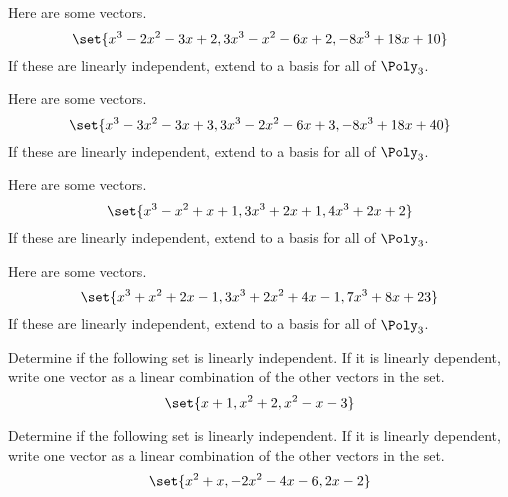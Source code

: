 \begin{ex} Here are some vectors.
\begin{equation*}
\set{x^{3}-2x^{2}-3x+2,3x^{3}-x^{2}-6x+2,-8x^{3}+18x+10}
\end{equation*}
If these are linearly independent, extend to a basis for all of $\Poly_{3}$.
\end{ex}

\begin{ex} Here are some vectors.
\begin{equation*}
\set{x^{3}-3x^{2}-3x+3,3x^{3}-2x^{2}-6x+3,-8x^{3}+18x+40}
\end{equation*}
If these are linearly independent, extend to a basis for all of $\Poly_{3}$.
\end{ex}

\begin{ex} Here are some vectors.
\begin{equation*}
\set{x^{3}-x^{2}+x+1,3x^{3}+2x+1,4x^{3}+2x+2}
\end{equation*}
If these are linearly independent, extend to a basis for all of $\Poly_{3}$.
\end{ex}

\begin{ex} Here are some vectors.
\begin{equation*}
\set{x^{3}+x^{2}+2x-1,3x^{3}+2x^{2}+4x-1,7x^{3}+8x+23}
\end{equation*}
If these are linearly independent, extend to a basis for all of $\Poly_{3}$.
\end{ex}

\begin{ex} Determine if the following set is linearly independent. If it is linearly dependent, write one vector as a linear combination of the other vectors in the set.
\[
\set{x+1, x^2 + 2, x^2 - x -3 }
\]
\end{ex}

\begin{ex} Determine if the following set is linearly independent. If it is linearly dependent, write one vector as a linear combination of the other vectors in the set.
\[
\set{x^2 + x, -2x^2 -4x -6 , 2x - 2 }
\]
\end{ex}

